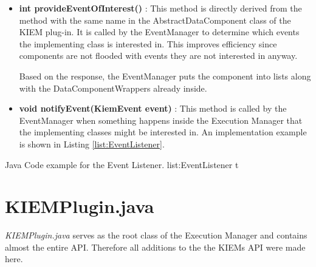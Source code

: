 \begin{itemize}
 \item \textbf{int provideEventOfInterest()} : This method is directly derived from the method with 
the same name in the AbstractDataComponent class of the \ac{KIEM} plug-in. It is called by the
EventManager to determine which events the implementing class is interested in.
This improves efficiency since components are not flooded with events they are not interested in anyway.

Based on the response, the EventManager puts the component into lists along with the DataComponentWrappers
already inside.
 \item \textbf{void notifyEvent(KiemEvent event)} : This method is called by the EventManager when 
something happens inside the Execution Manager that the implementing classes might be interested in. An
implementation example is shown in Listing \ref{list:EventListener}.
\end{itemize}
\listingjava
{}
{Java}
{Code example for the Event Listener.}
{list:EventListener}
{t}

\section{KIEMPlugin.java}
\label{section:ConfChangesKiemPlugin}
\textit{KIEMPlugin.java} serves as the root class of the Execution Manager and contains almost the entire \ac{API}.
Therefore all additions to the the \ac{KIEM}s \ac{API} were made here.

